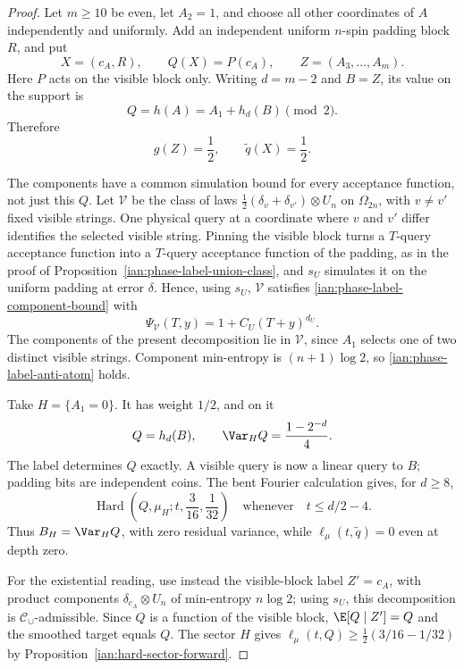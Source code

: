 \begin{proof}
Let \(m\ge10\) be even, let \(A_2=1\), and choose all other coordinates of \(A\) independently and uniformly. Add an independent uniform \(n\)-spin padding block \(R\), and put
\[
 X=(c_A,R),\qquad Q(X)=P(c_A),\qquad Z=(A_3,\ldots,A_m).
\]
Here \(P\) acts on the visible block only. Writing \(d=m-2\) and \(B=Z\), its value on the support is
\[
 Q=h(A)=A_1+h_d(B)\pmod2.
\]
Therefore
\[
 g(Z)=\frac12,\qquad \widetilde q(X)=\frac12.
\]

The components have a common simulation bound for every acceptance function, not just this \(Q\). Let \(\mathcal V\) be the class of laws \(\frac12(\delta_v+\delta_{v'})\otimes U_n\) on \(\Omega_{2n}\), with \(v\ne v'\) fixed visible strings. One physical query at a coordinate where \(v\) and \(v'\) differ identifies the selected visible string. Pinning the visible block turns a \(T\)-query acceptance function into a \(T\)-query acceptance function of the padding, as in the proof of Proposition~\ref{ian:phase-label-union-class}, and \(s_U\) simulates it on the uniform padding at error \(\delta\). Hence, using \(s_U\), \(\mathcal V\) satisfies \eqref{ian:phase-label-component-bound} with
\[
 \Psi_{\mathcal V}(T,y)=1+C_U(T+y)^{d_U}.
\]
The components of the present decomposition lie in \(\mathcal V\), since \(A_1\) selects one of two distinct visible strings. Component min-entropy is
\((n+1)\log2\), so \eqref{ian:phase-label-anti-atom} holds.

Take \(H=\{A_1=0\}\). It has weight \(1/2\), and on it
\[
 Q=h_d(B),\qquad
 \Var_H Q=\frac{1-2^{-d}}4.
\]
The label determines \(Q\) exactly. A visible query is now a linear query to \(B\); padding bits are independent coins. The bent Fourier calculation gives, for \(d\ge8\),
\[
 \operatorname{Hard}
 \left(Q,\mu_H;t,\frac3{16},\frac1{32}\right)
 \quad\text{whenever}\quad t\le d/2-4.
\]
Thus \(B_H=\Var_H Q\), with zero residual variance, while
\(\ell_\mu(t,\widetilde q)=0\) even at depth zero.

For the existential reading, use instead the visible-block label \(Z'=c_A\), with product components \(\delta_{c_A}\otimes U_n\) of min-entropy \(n\log2\); using \(s_U\), this decomposition is \(\mathcal C_\cup\)-admissible. Since \(Q\) is a function of the visible block, \(\E[Q\mid Z']=Q\) and the smoothed target equals \(Q\). The sector \(H\) gives \(\ell_\mu(t,Q)\ge\frac12(3/16-1/32)\) by Proposition~\ref{ian:hard-sector-forward}.
\end{proof}

